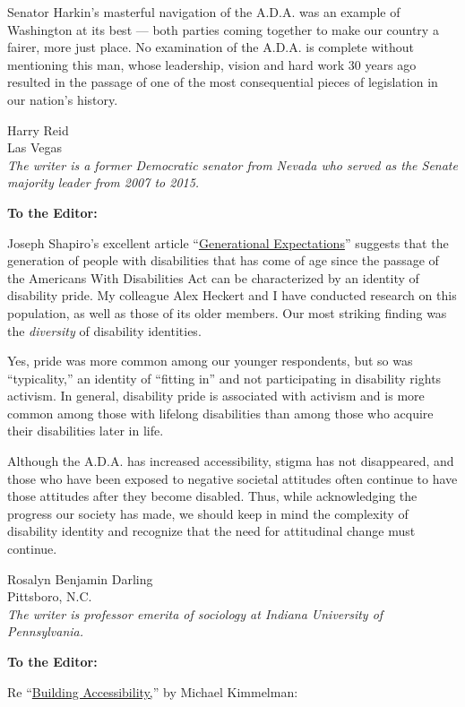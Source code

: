 Senator Harkin's masterful navigation of the A.D.A. was an example of
Washington at its best --- both parties coming together to make our
country a fairer, more just place. No examination of the A.D.A. is
complete without mentioning this man, whose leadership, vision and hard
work 30 years ago resulted in the passage of one of the most
consequential pieces of legislation in our nation's history.

Harry Reid\\
Las Vegas\\
\emph{The writer is a former Democratic senator from Nevada who served
as the Senate majority leader from 2007 to 2015.}

\textbf{To the Editor:}

Joseph Shapiro's excellent article
``\href{https://www.nytimes3xbfgragh.onion/2020/07/17/style/americans-with-disabilities-act.html}{Generational
Expectations}'' suggests that the generation of people with disabilities
that has come of age since the passage of the Americans With
Disabilities Act can be characterized by an identity of disability
pride. My colleague Alex Heckert and I have conducted research on this
population, as well as those of its older members. Our most striking
finding was the \emph{diversity} of disability identities.

Yes, pride was more common among our younger respondents, but so was
``typicality,'' an identity of ``fitting in'' and not participating in
disability rights activism. In general, disability pride is associated
with activism and is more common among those with lifelong disabilities
than among those who acquire their disabilities later in life.

Although the A.D.A. has increased accessibility, stigma has not
disappeared, and those who have been exposed to negative societal
attitudes often continue to have those attitudes after they become
disabled. Thus, while acknowledging the progress our society has made,
we should keep in mind the complexity of disability identity and
recognize that the need for attitudinal change must continue.

Rosalyn Benjamin Darling\\
Pittsboro, N.C.\\
\emph{The writer is professor emerita of sociology at Indiana University
of Pennsylvania.}

\textbf{To the Editor:}

Re
``\href{https://www.nytimes3xbfgragh.onion/2020/07/20/arts/disabilities-architecture-design.html}{Building
Accessibility,}'' by Michael Kimmelman:

